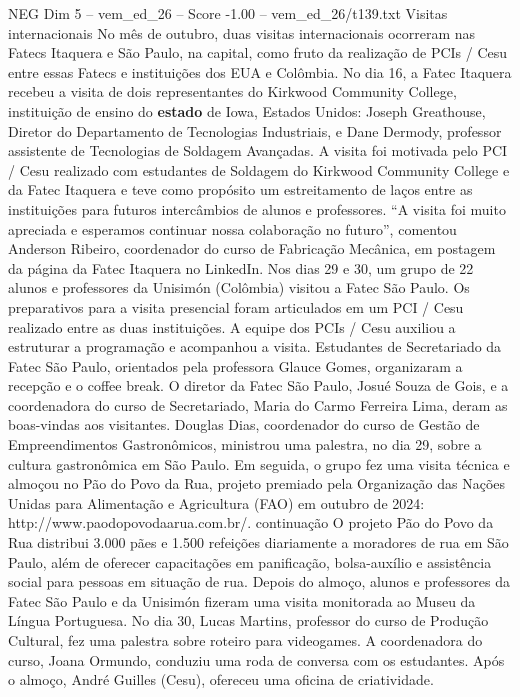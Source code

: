 \begin{textsample}{NEG Dim 5 – vem\_ed\_26 – Score -1.00 – vem\_ed\_26/t139.txt}  \label{ex:f5_neg_095}
Visitas internacionais No mês de outubro, duas visitas internacionais ocorreram nas Fatecs Itaquera e São Paulo, na capital, como fruto da realização de PCIs / Cesu entre essas Fatecs e instituições dos EUA e Colômbia.
No dia 16, a Fatec Itaquera recebeu a visita de dois representantes do Kirkwood Community College, instituição de ensino do \textbf{estado} de Iowa, Estados Unidos: Joseph Greathouse, Diretor do Departamento de Tecnologias Industriais, e Dane Dermody, professor assistente de Tecnologias de Soldagem Avançadas.
A visita foi motivada pelo PCI / Cesu realizado com estudantes de Soldagem do Kirkwood Community College e da Fatec Itaquera e teve como propósito um estreitamento de laços entre as instituições para futuros intercâmbios de alunos e professores. “A visita foi muito apreciada e esperamos continuar nossa colaboração no futuro”, comentou Anderson Ribeiro, coordenador do curso de Fabricação Mecânica, em postagem da página da Fatec Itaquera no LinkedIn.
Nos dias 29 e 30, um grupo de 22 alunos e professores da Unisimón (Colômbia) visitou a Fatec São Paulo.
Os preparativos para a visita presencial foram articulados em um PCI / Cesu realizado entre as duas instituições.
A equipe dos PCIs / Cesu auxiliou a estruturar a programação e acompanhou a visita.
Estudantes de Secretariado da Fatec São Paulo, orientados pela professora Glauce Gomes, organizaram a recepção e o coffee break.
O diretor da Fatec São Paulo, Josué Souza de Gois, e a coordenadora do curso de Secretariado, Maria do Carmo Ferreira Lima, deram as boas-vindas aos visitantes.
Douglas Dias, coordenador do curso de Gestão de Empreendimentos Gastronômicos, ministrou uma palestra, no dia 29, sobre a cultura gastronômica em São Paulo.
Em seguida, o grupo fez uma visita técnica e almoçou no Pão do Povo da Rua, projeto premiado pela Organização das Nações Unidas para Alimentação e Agricultura (FAO) em outubro de 2024: http://www.paodopovodaarua.com.br/. continuação O projeto Pão do Povo da Rua distribui 3.000 pães e 1.500 refeições diariamente a moradores de rua em São Paulo, além de oferecer capacitações em panificação, bolsa-auxílio e assistência social para pessoas em situação de rua.
Depois do almoço, alunos e professores da Fatec São Paulo e da Unisimón fizeram uma visita monitorada ao Museu da Língua Portuguesa.
No dia 30, Lucas Martins, professor do curso de Produção Cultural, fez uma palestra sobre roteiro para videogames.
A coordenadora do curso, Joana Ormundo, conduziu uma roda de conversa com os estudantes.
Após o almoço, André Guilles (Cesu), ofereceu uma oficina de criatividade.

\end{textsample}
